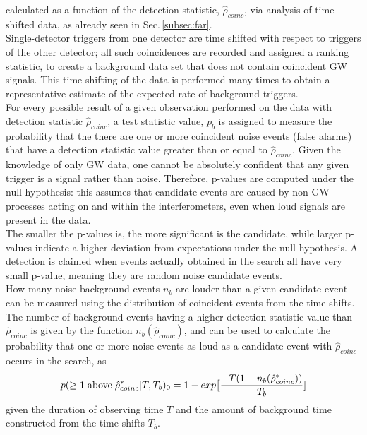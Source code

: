 \documentclass[binding=0.6cm, LaM]{sapthesis}
\begin{document}
	calculated as a function of the detection statistic, $\hat{\rho}_{coinc}$,
	via analysis of time-shifted data, as already seen in Sec.\,\ref{subsec:far}. \\
	Single-detector triggers from one detector are time shifted with respect to triggers of the other detector;
	all such coincidences are recorded and assigned a ranking statistic, 
	to create a background data set that does not contain coincident GW signals.
	This time-shifting of the data is performed many times to obtain a representative estimate of the expected rate of background triggers. \\
	For every possible result of a given observation performed on the data with detection statistic $\hat{\rho}_{coinc}$, 
	a test statistic value, $p_b$ is assigned to measure the probability that the 
	there are one or more coincident noise events (false alarms) that have
	a detection statistic value greater than or equal to $\hat{\rho}_{coinc}$. 
	Given the knowledge of only GW data, one cannot be absolutely confident that 
	any given trigger is a signal rather than noise. 
	Therefore, p-values are computed under the null hypothesis: this assumes that candidate events 
	are caused by non-GW processes acting on and within the interferometers,
	even when loud signals are present in the data. \\
	The smaller the p-values is, the more significant is the candidate,
	while larger p-values indicate a higher deviation from expectations under the null hypothesis.
	A detection is claimed when events actually obtained in the search all have very small p-value,
	meaning they are random noise candidate events. \\
	How many noise background events $n_b$ are louder than a given candidate event
	can be measured using the distribution of coincident events from the time shifts.
	The number of background events having a higher detection-statistic value than $\hat{\rho}_{coinc}$
	is given by the function $n_b(\hat{\rho}_{coinc})$, and can be used to calculate 
	the probability that one or more noise events as loud as a candidate event with $\hat{\rho}_{coinc}$
	occurs in the search, as 
		\begin{equation}
			p(\geq 1 \hspace*{0.1cm}\text{above}\hspace*{0.1cm} \hat{\rho}_{coinc}^*|T,T_b)_0 = 1 - exp\big[ {{-T(1+n_b(\hat{\rho}_{coinc}^*))} \over {T_b}}]
		\end{equation}
	 given the duration of observing time $T$ and the amount of background time 
	constructed from the time shifts $T_b$. \cite{28}
\end{document}
